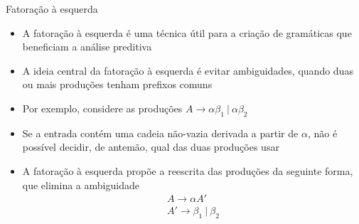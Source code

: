 \begin{frame}[fragile]{Fatoração à esquerda}

    \begin{itemize}
        \item A fatoração à esquerda é uma técnica útil para a criação de gramáticas que beneficiam a análise preditiva

        \item A ideia central da fatoração à esquerda é evitar ambiguidades, quando duas ou mais produções tenham prefixos comuns

        \item Por exemplo, considere as produções $A \to \alpha \beta_1\ |\ \alpha \beta_2$

        \item Se a entrada contém uma cadeia não-vazia derivada a partir de $\alpha$, não é possível decidir, de antemão, qual das duas produções usar

        \item A fatoração à esquerda propõe a reescrita das produções da seguinte forma, que elimina a ambiguidade
        \[
            \begin{array}{l}
                A \to \alpha A' \\
                A' \to \beta_1\ |\ \beta_2
            \end{array}
        \]
    \end{itemize}

\end{frame}

